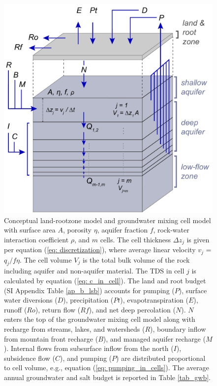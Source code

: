 \begin{figure}[H]
	\centering
	\includegraphics[width=12cm,keepaspectratio]{ch3_figs/mm_conceptual_model.pdf}
	\caption{Conceptual land-rootzone model and groundwater mixing cell model with surface area $A$, porosity $\eta$, aquifer fraction $f$, rock-water interaction coefficient $\rho$, and $m$ cells. The cell thickness $\Delta z_j$ is given per equation (\ref{eq: discretization}), where average linear velocity $v_j$ = $q_j / f \eta$. The cell volume $V_j$ is the total bulk volume of the rock including aquifer and non-aquifer material. The TDS in cell $j$ is calculated by equation (\ref{eq: c_in_cell}). The land and root budget (SI Appendix Table \ref{ap_b_lsb}) accounts for pumping ($P$), surface water diversions ($D$), precipitation ($Pt$), evapotranspiration ($E$), runoff ($Ro$), return flow ($Rf$), and net deep percolation ($N$). $N$ enters the top of the groundwater mixing cell model along with recharge from streams, lakes, and watersheds ($R$), boundary inflow from mountain front recharge ($B$), and managed aquifer recharge ($M$). Internal flows from subsurface inflow from the north ($I$), subsidence flow ($C$), and pumping ($P$) are distributed proportional to cell volume, e.g., equation (\ref{eq: pumping_in_cells}). The average annual groundwater and salt budget is reported in Table \ref{tab_gwb}.}
	\label{fig:conceptual_model_mm}
\end{figure}



